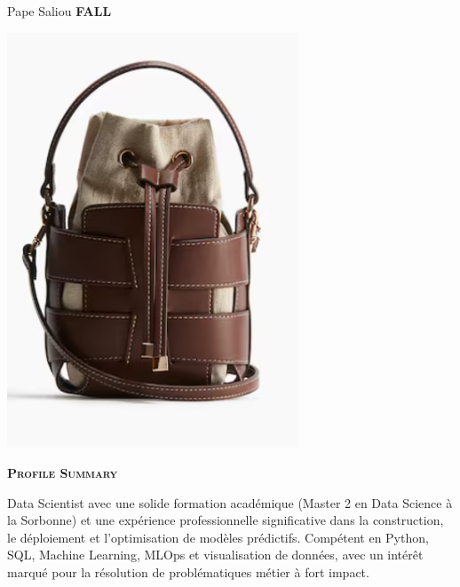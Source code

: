 \documentclass[11pt,a4paper]{article}
\newcommand{\headleft}[1]{\vspace*{3ex}\textsc{\textbf{#1}}\par%
    \vspace*{-1.5ex}\hrulefill\par\vspace*{0.7ex}}
\begin{document}
\setlength{\topskip}{0pt}\setlength{\parindent}{0pt}\setlength{\parskip}{0pt}
\setlength{\fboxsep}{0pt}\pagestyle{empty}\raggedbottom

\begin{minipage}[t]{0.33\textwidth}
\colorbox{cvblue}{\begin{minipage}[t][5mm][t]{\textwidth}\null\hfill\null\end{minipage}}
\vspace{-.2ex}
\colorbox{cvblue!90}{\color{white}
\textwidth
\begin{minipage}[t][293mm][t]{0.82\textwidth}\raggedright
\vspace*{2.5ex}

\Large Pape Saliou \textbf{\textsc{FALL}} \normalsize

\null\hfill\includegraphics[width=0.65\textwidth]{ 70b0aeef46744dac9ceba7301f30bd8a.png }\hfill\null

\vspace*{0.5ex}

\headleft{Profile Summary}
Data Scientist avec une solide formation académique (Master 2 en Data Science à la Sorbonne) et une expérience professionnelle significative dans la construction, le déploiement et l’optimisation de modèles prédictifs. Compétent en Python, SQL, Machine Learning, MLOps et visualisation de données, avec un intérêt marqué pour la résolution de problématiques métier à fort impact.


\end{minipage}}
\end{minipage}
\end{document}
